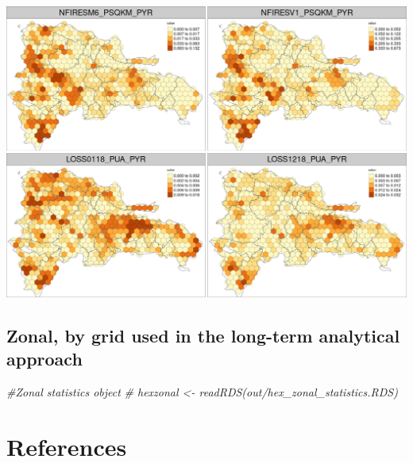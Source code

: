 \documentclass[10pt,landscape,a3paper]{article}
\newenvironment{Shaded}{\begin{snugshade}}{\end{snugshade}}
\newcommand{\CommentTok}[1]{\textcolor[rgb]{0.56,0.35,0.01}{\textit{#1}}}
\begin{document}
\begin{center}\includegraphics{img/zonal-long-term-grid-15} \end{center}

\hypertarget{zonal-by-grid-used-in-the-long-term-analytical-approach-1}{%
\subsection{Zonal, by grid used in the long-term analytical
approach}\label{zonal-by-grid-used-in-the-long-term-analytical-approach-1}}

\begin{Shaded}
\begin{Highlighting}[]
\CommentTok{\#Zonal statistics object}
\CommentTok{\# hexzonal \textless{}{-} readRDS(\textquotesingle{}out/hex\_zonal\_statistics.RDS\textquotesingle{})}
\end{Highlighting}
\end{Shaded}

\hypertarget{references}{%
\section*{References}\label{references}}
\end{document}
